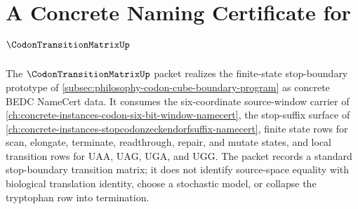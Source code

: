 \chapter{A Concrete Naming Certificate for $\CodonTransitionMatrixUp$}
\label{ch:concrete-instances-codon-transition-matrix-namecert}

The $\CodonTransitionMatrixUp$ packet realizes the finite-state stop-boundary prototype of \autoref{subsec:philosophy-codon-cube-boundary-program} as concrete BEDC NameCert data. It consumes the six-coordinate source-window carrier of \autoref{ch:concrete-instances-codon-six-bit-window-namecert}, the stop-suffix surface of \autoref{ch:concrete-instances-stopcodonzeckendorfsuffix-namecert}, finite state rows for scan, elongate, terminate, readthrough, repair, and mutate states, and local transition rows for $\mathrm{UAA}$, $\mathrm{UAG}$, $\mathrm{UGA}$, and $\mathrm{UGG}$. The packet records a standard stop-boundary transition matrix; it does not identify source-space equality with biological translation identity, choose a stochastic model, or collapse the tryptophan row into termination.

